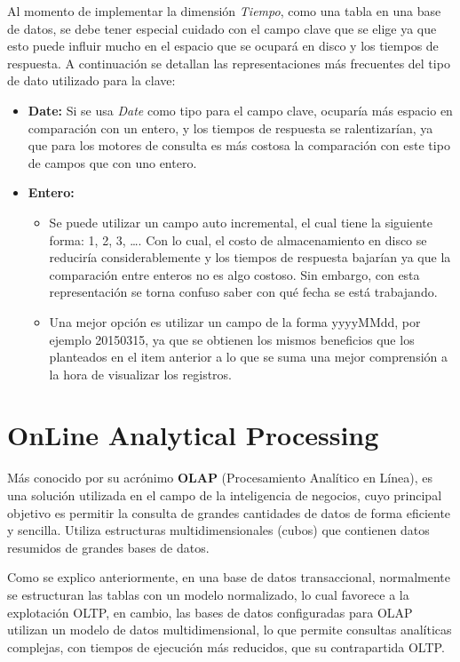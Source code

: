 \documentclass[a4paper,11pt]{article}
\begin{document}
    Al momento de implementar la dimensión \textit{Tiempo}, como una tabla en una base de datos, se debe tener especial cuidado con el campo clave que se elige
    ya que esto puede influir  mucho en el espacio que se ocupará en disco y los tiempos de respuesta.
    A continuación se detallan las representaciones más frecuentes del tipo de dato utilizado para la clave:
    
    \begin{itemize}
      \item \textbf{Date:} Si se usa \textit{Date} como tipo para el campo clave, ocuparía más espacio en comparación con un entero, y los tiempos de respuesta se
      ralentizarían, ya que para los motores de consulta es más costosa la comparación con este tipo de campos que con uno entero.
      \item \textbf{Entero:}
      \begin{itemize}
        \item Se puede utilizar un campo auto incremental, el cual tiene la siguiente forma: 1, 2, 3, \dots. Con lo cual, el costo de almacenamiento en disco
        se reduciría considerablemente y los tiempos de respuesta bajarían ya que la comparación entre enteros no es algo costoso. Sin embargo, con esta representación
        se torna confuso saber con qué fecha se está trabajando.
        \item Una mejor opción es utilizar un campo de la forma yyyyMMdd, por ejemplo 20150315, ya que se obtienen los mismos beneficios que los planteados
        en el item anterior a lo que se suma una mejor comprensión a la hora de visualizar los registros.
      \end{itemize}
    \end{itemize}
    
    
    \section{OnLine Analytical Processing} \label{OLAP}
    
    Más conocido por su acrónimo \textbf{OLAP} (Procesamiento Analítico en Línea), es una solución utilizada en el campo de la inteligencia de negocios, cuyo 
    principal objetivo es permitir la consulta de grandes cantidades de datos de forma eficiente y sencilla. Utiliza estructuras multidimensionales (cubos) que 
    contienen datos resumidos de grandes bases de datos.
    
    Como se explico anteriormente, en una base de datos transaccional, normalmente se estructuran las tablas con un modelo normalizado, lo cual favorece a
    la explotación OLTP, en cambio, las bases de datos configuradas para OLAP utilizan un modelo de datos multidimensional, lo que permite consultas 
    analíticas complejas, con tiempos de ejecución más reducidos, que su contrapartida OLTP.
\end{document}
